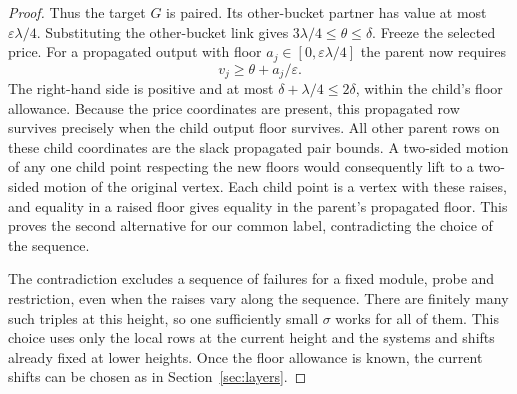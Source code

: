 \begin{proof}
Thus the target $G$ is paired. Its other-bucket partner has value at most
$\varepsilon\lambda/4$. Substituting the other-bucket link gives
$3\lambda/4\le\theta\le\delta$. Freeze the selected price. For a
propagated output with floor $a_j\in[0,\varepsilon\lambda/4]$ the
parent now requires
\[
                  v_j\ge \theta+a_j/\varepsilon .
\]
The right-hand side is positive and at most $\delta+\lambda/4\le2\delta$,
within the child's floor allowance. Because the price coordinates are
present, this propagated row survives precisely when the child output
floor survives. All other parent rows on these child coordinates
are the slack propagated pair bounds. A two-sided motion of any one
child point respecting the new floors would consequently lift to a
two-sided motion of the original vertex. Each child point is a vertex
with these raises, and equality in a raised floor gives equality in
the parent's propagated floor. This proves the second alternative for
our common label, contradicting the choice of the sequence.

The contradiction excludes a sequence of failures for a fixed module,
probe and restriction, even when the raises vary along the sequence.
There are finitely many such triples at this height, so one sufficiently
small \(\sigma\) works for all of them. This choice uses only the local
rows at the current height and the systems and shifts already fixed at
lower heights. Once the floor allowance is known, the current shifts
can be chosen as in Section~\ref{sec:layers}.
\end{proof}
